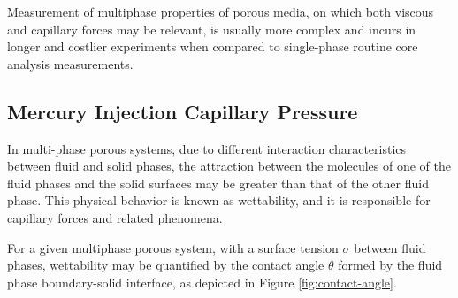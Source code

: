 \documentclass[english,msc,numbers]{coppe}
\begin{document}
  Measurement of multiphase properties of porous media, on which both viscous and capillary forces may be relevant, is usually more complex and incurs in longer and costlier experiments when compared to single-phase routine core analysis measurements.
  
  \hypertarget{mercury-injection-capillary-pressure}{%
  \subsection{Mercury Injection Capillary Pressure}\label{mercury-injection-capillary-pressure}}
  
  In multi-phase porous systems, due to different interaction characteristics between fluid and solid phases, the attraction between the molecules of one of the fluid phases and the solid surfaces may be greater than that of the other fluid phase. This physical behavior is known as wettability, and it is responsible for capillary forces and related phenomena.
  
  For a given multiphase porous system, with a surface tension \(\sigma\) between fluid phases, wettability may be quantified by the contact angle \(\theta\) formed by the fluid phase boundary-solid interface, as depicted in Figure \ref{fig:contact-angle}.
  
\end{document}

